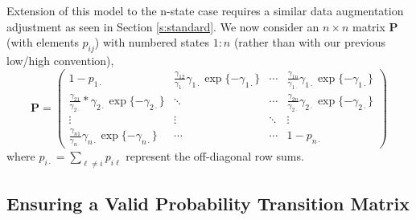 \documentclass[smallextended]{svjour3}       %
\begin{document}
Extension of this model to the n-state case requires a similar data augmentation adjustment as seen in Section \ref{s:standard}. We now consider an $n \times n$ matrix $\mathbf{P}$ (with elements $p_{ij}$) with numbered states $1:n$ (rather than with our previous low/high convention), 
\begin{equation}
\bm{P} = \begin{pmatrix}
1 - p_{1\cdot} & \frac{\gamma_{12}}{\gamma_{1 \cdot}}\gamma_{1\cdot}\exp\{- \gamma_{1\cdot}\}  & \cdots &  \frac{\gamma_{1n}}{\gamma_{1 \cdot}} \gamma_{1\cdot}\exp\{- \gamma_{1\cdot}\}  \\
 \frac{\gamma_{21}}{\gamma_{2 \cdot}} * \gamma_{2\cdot}\exp\{- \gamma_{2\cdot}\}  &  \ddots & \cdots & \frac{\gamma_{2n}}{\gamma_{2 \cdot}} \gamma_{2\cdot}\exp\{- \gamma_{2\cdot}\}  \\
\vdots & \vdots & \ddots & \vdots \\
 \frac{\gamma_{n1}}{\gamma_{n \cdot}} \gamma_{n\cdot}\exp\{- \gamma_{n\cdot}\}  & \cdots & \cdots & 1 - p_{n \cdot}
\end{pmatrix}
\label{e:nstatePTM}
\end{equation}
where $p_{i\cdot} = \sum_{\ell \neq i} p_{i\ell}$ represent the off-diagonal row sums.
\subsection{Ensuring a Valid Probability Transition Matrix}
\end{document}
